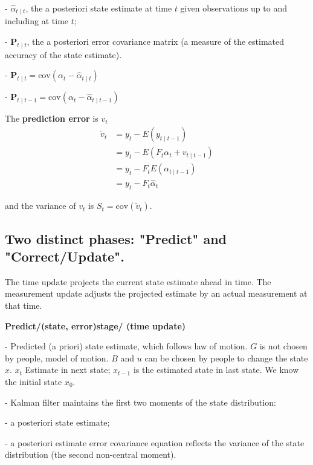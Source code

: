 -    $\hat{\alpha}_{t\mid t}$, the a posteriori state estimate at time $t$ given observations up to  and including at time $t$;

-    $\mathbf{P}_{t\mid t}$, the a posteriori error covariance matrix (a measure of the estimated accuracy of the state estimate).

-    $\mathbf{P}_{t\mid t} = \mathrm{cov}(\alpha_t - \hat{\alpha}_{t\mid t})$

-    $\mathbf{P}_{t\mid t-1} = \mathrm{cov}(\alpha_t - \hat{\alpha}_{t\mid t-1})$


The \textbf{prediction error} is $v_t$ 
$$\begin{aligned}
\tilde v_t  &= y_t -E(y_{t\mid t-1} ) \\
& = y_t -E( F_{t}\alpha_{t}+v_{t\mid t-1} ) \\
& = y_t - F_{t} E(\alpha_{t\mid t-1} ) \\
& = y_t -F_{t} \hat \alpha_{t}
\end{aligned}$$

and the variance of $v_t$ is  $S_{t} = \mathrm{cov}(\tilde{{v}}_t)$.




\subsection{Two distinct phases: "Predict" and "Correct/Update".} 



The time update projects the current state estimate ahead in time. The measurement update adjusts the projected estimate by an actual measurement at that time.



\textbf{Predict/(state, error)stage/ (time update)} 



-  	Predicted (a priori) state estimate, which follows law of motion. $G$ is not chosen by people, model of motion. $B$ and $u$ can be chosen by people to change the state $x$.  $x_t$ Estimate in next state; $x_{t-1}$ is the estimated state in last state. We know the initial state $x_0$.  

-  	Kalman filter maintains the first two moments of the state distribution: 

-  a posteriori state estimate;  

-  a posteriori estimate error covariance equation reflects the variance of the state distribution (the second non-central moment). 

